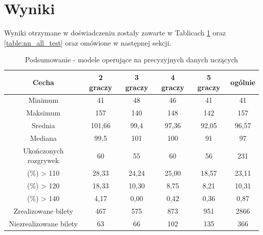 \documentclass[12pt, oneside]{report}
\begin{document}
\section{Wyniki}
Wyniki otrzymane w doświadczeniu zostały zawarte w Tablicach \ref{table:nn_single_test} oraz  \ref{table:nn_all_test} oraz omówione w następnej sekcji.
\begin{table}[h]
	\begin{center}
		\begin{tabular}{| c | c | c | c | c | c |} \hline
			Cecha & 2 graczy & 3 graczy & 4 graczy & 5 graczy & ogólnie \\ \hline
			Minimum & 41 & 48 & 46 & 41 & 41 \\ \hline
			Maksimum & 157 & 140 & 148 & 142 & 157 \\ \hline
			Srednia & 101,66 & 99,4 & 97,36 & 92,05 & 96,57 \\ \hline
			Mediana & 99,5 & 101 & 100 & 91 & 97 \\ \hline
			Ukończonych rozgrywek & 60 & 55 & 60 & 56 & 231 \\ \hline
			(\%) > 110 & 28,33 & 24,24 & 25,00 & 18,57 & 23,11 \\ \hline
			(\%) > 120 & 18,33 & 10,30 & 8,75 & 8,21 & 10,31 \\ \hline
			(\%) > 140 & 4,17 & 0,00 & 0,42 & 0,36 & 0,87 \\ \hline
			Zrealizowane bilety & 467 & 575 & 873 & 951 & 2866 \\ \hline
			Niezrealizowane bilety & 63 & 66 & 102 & 135 & 366 \\ \hline
		\end{tabular}
		\caption{Podsumowanie - modele operujące na precyzyjnych danych uczących}
		\label{table:nn_single_test}
	\end{center}
\end{table}
\end{document}
